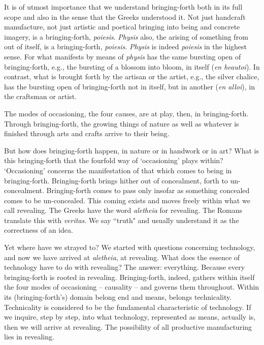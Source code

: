 \documentclass[12pt]{article}
\begin{document}
It is of utmost importance that we understand bringing-forth both in its full scope and also in the sense that the Greeks understood it. Not just handcraft manufacture, not just artistic and poetical bringing into being and concrete imagery, is a bringing-forth, \textit{poi{\-e}sis}. \textit{Physis} also, the arising of something from out of itself, is a bringing-forth, \textit{poi{\-e}sis}. \textit{Physis} is indeed \textit{poi{\-e}sis} in the highest sense. For what manifests by means of \textit{physis} has the same bursting open of bringing-forth, e.g., the bursting of a blossom into bloom, in itself (\textit{en heaut{\-o}i}). In contrast, what is brought forth by the artisan or the artist, e.g., the silver chalice, has the bursting open of bringing-forth not in itself, but in another (\textit{en all{\-o}i}), in the craftsman or artist.

The modes of occasioning, the four causes, are at play, then, in bringing-forth. Through bringing-forth, the growing things of nature as well as whatever is finished through arts and crafts arrive to their being.

But how does bringing-forth happen, in nature or in handwork or in art? What is this bringing-forth that the fourfold way of `occasioning' plays within? `Occasioning' concerns the manifestation of that which comes to being in bringing-forth. Bringing-forth brings hither out of concealment, forth to un-concealment. Bringing-forth comes to pass only insofar as something concealed comes to be un-concealed. This coming exists and moves freely within what we call revealing. The Greeks have the word \textit{al{\-e}theia} for revealing. The Romans translate this with \textit{veritas}. We say ``truth" and usually understand it as the correctness of an idea.

\vspace{10mm}

Yet where have we strayed to? We started with questions concerning technology, and now we have arrived at \textit{al{\-e}theia}, at revealing. What does the essence of technology have to do with revealing? The answer: everything. Because every bringing-forth is rooted in revealing. Bringing-forth, indeed, gathers within itself the four modes of occasioning -- causality -- and governs them throughout. Within its (bringing-forth's) domain belong end and means, belongs technicality. Technicality is considered to be the fundamental characteristic of technology. If we inquire, step by step, into what technology, represented as means, actually is, then we will arrive at revealing. The possibility of all productive manufacturing lies in revealing.
\end{document}
